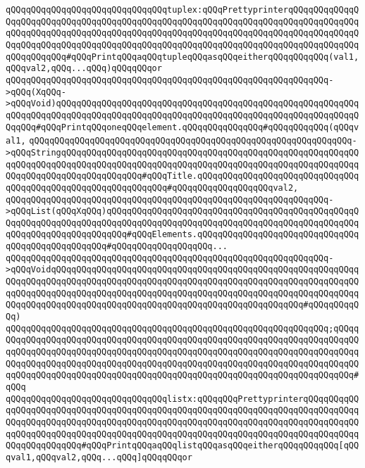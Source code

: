 \verb|qQQqqQQqqQQqqQQqqQQqqQQqqQQqqQQqtuplex:qQQqPrettyprinterqQQqqQQqqQQqqQQqqQQqqQQqqQQqqQQqqQQqqQQqqQQqqQQqqQQqqQQqqQQqqQQqqQQqqQQqqQQqqQQqqQQqqQQqqQQqqQQqqQQqqQQqqQQqqQQqqQQqqQQqqQQqqQQqqQQqqQQqqQQqqQQqqQQqqQQqqQQqqQQqqQQqqQQqqQQqqQQqqQQqqQQqqQQqqQQqqQQqqQQqqQQqqQQqqQQqqQQqqQQqqQQqqQQqqQQqqQQq#qQQqPrintqQQqaqQQqtupleqQQqasqQQqeitherqQQqqQQqqQQq(val1,qQQqval2,qQQq...qQQq)qQQqqQQqor|\newline
\verb|qQQqqQQqqQQqqQQqqQQqqQQqqQQqqQQqqQQqqQQqqQQqqQQqqQQqqQQqqQQqqQQq->qQQq(XqQQq->qQQqVoid)qQQqqQQqqQQqqQQqqQQqqQQqqQQqqQQqqQQqqQQqqQQqqQQqqQQqqQQqqQQqqQQqqQQqqQQqqQQqqQQqqQQqqQQqqQQqqQQqqQQqqQQqqQQqqQQqqQQqqQQqqQQqqQQqqQQqqQQq#qQQqPrintqQQqoneqQQqelement.qQQqqQQqqQQqqQQq#qQQqqQQqqQQq(qQQqval1,|\newline
\verb|qQQqqQQqqQQqqQQqqQQqqQQqqQQqqQQqqQQqqQQqqQQqqQQqqQQqqQQqqQQqqQQq->qQQqStringqQQqqQQqqQQqqQQqqQQqqQQqqQQqqQQqqQQqqQQqqQQqqQQqqQQqqQQqqQQqqQQqqQQqqQQqqQQqqQQqqQQqqQQqqQQqqQQqqQQqqQQqqQQqqQQqqQQqqQQqqQQqqQQqqQQqqQQqqQQqqQQqqQQqqQQqqQQq#qQQqTitle.qQQqqQQqqQQqqQQqqQQqqQQqqQQqqQQqqQQqqQQqqQQqqQQqqQQqqQQqqQQqqQQq#qQQqqQQqqQQqqQQqqQQqval2,|\newline
\verb|qQQqqQQqqQQqqQQqqQQqqQQqqQQqqQQqqQQqqQQqqQQqqQQqqQQqqQQqqQQqqQQq->qQQqList(qQQqXqQQq)qQQqqQQqqQQqqQQqqQQqqQQqqQQqqQQqqQQqqQQqqQQqqQQqqQQqqQQqqQQqqQQqqQQqqQQqqQQqqQQqqQQqqQQqqQQqqQQqqQQqqQQqqQQqqQQqqQQqqQQqqQQqqQQqqQQqqQQqqQQqqQQq#qQQqElements.qQQqqQQqqQQqqQQqqQQqqQQqqQQqqQQqqQQqqQQqqQQqqQQqqQQq#qQQqqQQqqQQqqQQqqQQq...|\newline
\verb|qQQqqQQqqQQqqQQqqQQqqQQqqQQqqQQqqQQqqQQqqQQqqQQqqQQqqQQqqQQqqQQq->qQQqVoidqQQqqQQqqQQqqQQqqQQqqQQqqQQqqQQqqQQqqQQqqQQqqQQqqQQqqQQqqQQqqQQqqQQqqQQqqQQqqQQqqQQqqQQqqQQqqQQqqQQqqQQqqQQqqQQqqQQqqQQqqQQqqQQqqQQqqQQqqQQqqQQqqQQqqQQqqQQqqQQqqQQqqQQqqQQqqQQqqQQqqQQqqQQqqQQqqQQqqQQqqQQqqQQqqQQqqQQqqQQqqQQqqQQqqQQqqQQqqQQqqQQqqQQqqQQqqQQqqQQq#qQQqqQQqqQQq)|\newline
\verb|qQQqqQQqqQQqqQQqqQQqqQQqqQQqqQQqqQQqqQQqqQQqqQQqqQQqqQQqqQQqqQQq;qQQqqQQqqQQqqQQqqQQqqQQqqQQqqQQqqQQqqQQqqQQqqQQqqQQqqQQqqQQqqQQqqQQqqQQqqQQqqQQqqQQqqQQqqQQqqQQqqQQqqQQqqQQqqQQqqQQqqQQqqQQqqQQqqQQqqQQqqQQqqQQqqQQqqQQqqQQqqQQqqQQqqQQqqQQqqQQqqQQqqQQqqQQqqQQqqQQqqQQqqQQqqQQqqQQqqQQqqQQqqQQqqQQqqQQqqQQqqQQqqQQqqQQqqQQqqQQqqQQqqQQqqQQqqQQqqQQqqQQqqQQq#qQQq|\newline
\newline
\verb|qQQqqQQqqQQqqQQqqQQqqQQqqQQqqQQqlistx:qQQqqQQqPrettyprinterqQQqqQQqqQQqqQQqqQQqqQQqqQQqqQQqqQQqqQQqqQQqqQQqqQQqqQQqqQQqqQQqqQQqqQQqqQQqqQQqqQQqqQQqqQQqqQQqqQQqqQQqqQQqqQQqqQQqqQQqqQQqqQQqqQQqqQQqqQQqqQQqqQQqqQQqqQQqqQQqqQQqqQQqqQQqqQQqqQQqqQQqqQQqqQQqqQQqqQQqqQQqqQQqqQQqqQQqqQQqqQQqqQQqqQQqqQQq#qQQqPrintqQQqaqQQqlistqQQqasqQQqeitherqQQqqQQqqQQq[qQQqval1,qQQqval2,qQQq...qQQq]qQQqqQQqor|\newline
